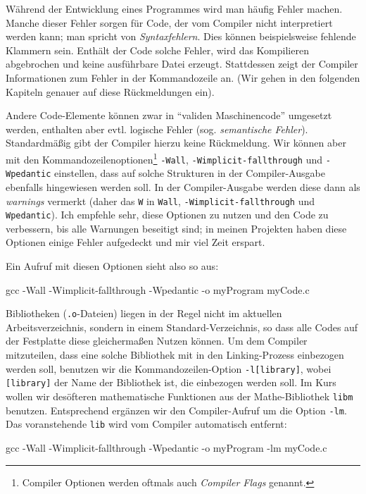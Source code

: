 Während der Entwicklung eines Programmes wird man häufig Fehler machen. Manche dieser Fehler sorgen für Code, der vom Compiler nicht interpretiert werden kann; man spricht \ua von \emph{Syntaxfehlern}. Dies können beispielsweise fehlende Klammern sein. Enthält der Code solche Fehler, wird das Kompilieren abgebrochen und keine ausführbare Datei erzeugt. Stattdessen zeigt der Compiler Informationen zum Fehler in der Kommandozeile an. (Wir gehen in den folgenden Kapiteln genauer auf diese Rückmeldungen ein).

Andere Code-Elemente können zwar in \enquote{validen Maschinencode} umgesetzt werden, enthalten aber evtl. logische Fehler (sog. \emph{semantische Fehler}). Standardmäßig gibt der Compiler hierzu keine Rückmeldung. Wir können aber mit den Kommandozeilenoptionen\footnote{Compiler Optionen werden oftmals auch \emph{Compiler Flags} genannt.} \texttt{-Wall}, \texttt{-Wimplicit-fallthrough} und \texttt{-Wpedantic} einstellen, dass auf solche Strukturen in der Compiler-Ausgabe ebenfalls hingewiesen werden soll. In der Compiler-Ausgabe werden diese dann als \emph{warnings} vermerkt (daher das \texttt{W} in \texttt{Wall}, \texttt{-Wimplicit-fallthrough} und \texttt{Wpedantic}). Ich empfehle sehr, diese Optionen zu nutzen und den Code zu verbessern, bis alle Warnungen beseitigt sind; in meinen Projekten haben diese Optionen einige Fehler aufgedeckt und mir viel Zeit erspart.

Ein Aufruf mit diesen Optionen sieht also so aus:
\begin{cmdbox}
gcc -Wall -Wimplicit-fallthrough -Wpedantic -o myProgram myCode.c
\end{cmdbox}

Bibliotheken (\eg \texttt{.o}-Dateien) liegen in der Regel nicht im aktuellen Arbeitsverzeichnis, sondern in einem Standard-Verzeichnis, so dass alle Codes auf der Festplatte diese gleichermaßen Nutzen können. Um dem Compiler mitzuteilen, dass eine solche Bibliothek mit in den Linking-Prozess einbezogen werden soll, benutzen wir die Kommandozeilen-Option \texttt{-l[library]}, wobei \texttt{[library]} der Name der Bibliothek ist, die einbezogen werden soll. Im Kurs wollen wir \eg desöfteren mathematische Funktionen aus der Mathe-Bibliothek \texttt{libm} benutzen. Entsprechend ergänzen wir den Compiler-Aufruf um die Option \texttt{-lm}. Das voranstehende \texttt{lib} wird vom Compiler automatisch entfernt:
\begin{cmdbox}
gcc -Wall -Wimplicit-fallthrough -Wpedantic -o myProgram -lm myCode.c
\end{cmdbox}

